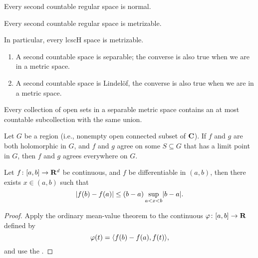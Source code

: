 \begin{prop}
    Every second countable regular space is normal.
\end{prop}

\begin{namedthm}
    Every second countable regular space is metrizable.
\end{namedthm}

In particular, every lcscH space is metrizable.

\begin{prop} \label{prop:2nd-count-separable-lindlof} \leavevmode
    \begin{enumerate}
        \item A second countable space is separable; the converse is also true when we are in a metric space.
        \item A second countable space is Lindelöf, the converse is also true when we are in a metric space.
    \end{enumerate}
\end{prop}

\begin{prop} \label{prop:Lind-property-sep-metric-space}
    Every collection of open sets in a separable metric space contains an at most countable subcollection with the same union.
\end{prop}

\begin{namedthm} \label{thm:uniqueness-cplx}
    Let $G$ be a region (i.e., nonempty open connected subset of $\mathbf{C}$). If $f$ and $g$ are both holomorphic in $G$, and $f$ and $g$ agree on some $S \subseteq G$ that has a limit point in $G$, then $f$ and $g$ agrees everywhere on $G$.
\end{namedthm}

\begin{namedthm}
    Let $f\colon [a,b] \to \mathbf{R}^d$ be continuous, and $f$ be differentiable in $(a,b)$, then there exists $x \in (a,b)$ such that \[
        \lvert f(b) - f(a) \rvert \leq (b-a) \sup_{a< x < b} \lvert b - a \rvert.
    \]
\end{namedthm}
\begin{proof}
    Apply the ordinary mean-value theorem to the continuous $\varphi\colon [a,b] \to \mathbf{R}$ defined by \[
        \varphi(t) = \langle f(b) - f(a), f(t) \rangle,
    \] and use the .
\end{proof}

